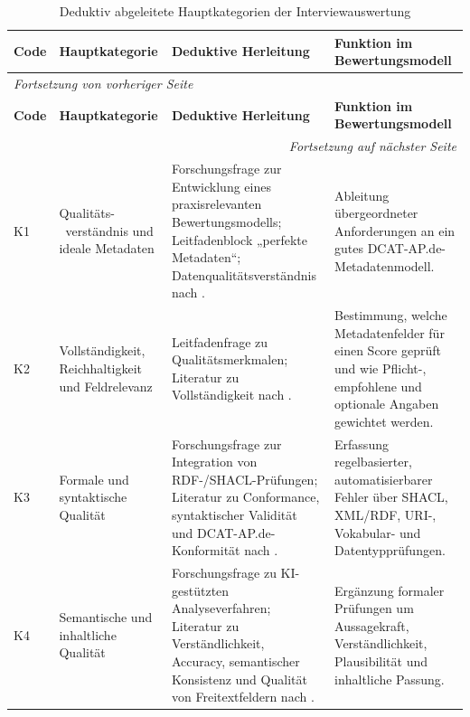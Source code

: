 \begin{center}
\scriptsize
\setlength{\tabcolsep}{4pt}
\renewcommand{\arraystretch}{0.9}
\begin{longtable}{p{} p{} p{} p{}}
\caption{Deduktiv abgeleitete Hauptkategorien der Interviewauswertung}
\label{tab:hauptkategorien}\\
\toprule
\textbf{Code} & \textbf{Hauptkategorie} & \textbf{Deduktive Herleitung} & \textbf{Funktion im Bewertungsmodell} \\
\midrule
\endfirsthead

\multicolumn{4}{l}{\textit{Fortsetzung von vorheriger Seite}} \\
\toprule
\textbf{Code} & \textbf{Hauptkategorie} & \textbf{Deduktive Herleitung} & \textbf{Funktion im Bewertungsmodell} \\
\midrule
\endhead

\midrule
\multicolumn{4}{r}{\textit{Fortsetzung auf nächster Seite}} \\
\endfoot

\bottomrule
\endlastfoot

K1 & Qualitäts- \ verständnis und ideale Metadaten & Forschungsfrage zur Entwicklung eines praxisrelevanten Bewertungsmodells; Leitfadenblock „perfekte Metadaten“; Datenqualitätsverständnis nach \cite{wang1996beyond}. & Ableitung übergeordneter Anforderungen an ein gutes DCAT-AP.de-Metadatenmodell. \\ \hline

K2 & Vollständigkeit, Reichhaltigkeit und Feldrelevanz & Leitfadenfrage zu Qualitätsmerkmalen; Literatur zu Vollständigkeit nach \cite{wentzel2023extensive, wilkinson2016fair, DCATAPDESpec2, DCATAPDESpec3}. & Bestimmung, welche Metadatenfelder für einen Score geprüft und wie Pflicht-, empfohlene und optionale Angaben gewichtet werden. \\ \hline

K3 & Formale und syntaktische Qualität & Forschungsfrage zur Integration von RDF-/SHACL-Prüfungen; Literatur zu Conformance, syntaktischer Validität und DCAT-AP.de-Konformität nach \cite{W3CRDF11Concepts, W3CSHACL, DCATAPDESpec2, DCATAPDESpec3, DCATAPDEImplRules2, Gayo2015LinkedDataValidationQuality}. & Erfassung regelbasierter, automatisierbarer Fehler über SHACL, \acrfull{XML}/RDF, URI-, Vokabular- und Datentypprüfungen. \\ \hline

K4 & Semantische und inhaltliche Qualität & Forschungsfrage zu KI-gestützten Analyseverfahren; Literatur zu Verständlichkeit, Accuracy, semantischer Konsistenz und Qualität von Freitextfeldern nach \cite{wang1996beyond, wand1996anchoring, StrongLeeWang1997, Zaveri2016LinkedDataQuality, noguerasiso_quality_metadata}. & Ergänzung formaler Prüfungen um Aussagekraft, Verständlichkeit, Plausibilität und inhaltliche Passung. \\ \hline


\end{longtable}
\end{center}
